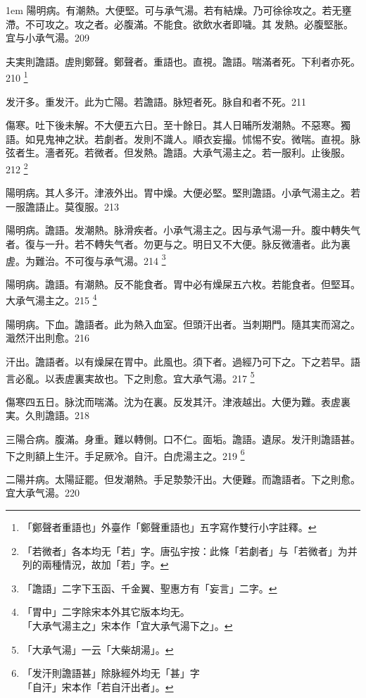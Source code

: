 \hangindent 1em
陽明病。有潮熱。大便堅。可与承气湯。若有結燥。乃可徐徐攻之。若无壅滯。不可攻之。攻之者。必腹滿。不能食。欲飲水者即噦。其{\sungtpii 𠊱}发熱。必腹堅胀。宜与小承气湯。{\gaoben}209

夫実則譫語。虗則鄭聲。鄭聲者。重語也。直視。譫語。喘滿者死。下利者亦死。210
	\footnote{「鄭聲者重語也」外臺作「鄭聲重語也」五字寫作雙行小字註釋。}

发汗多。重发汗。{\khaaitp 此为}亡陽。{\khaaitp 若}譫語。脉短者死。脉自和者不死。211

傷寒。吐下後未解。不大便五六日。至十餘日。其人日晡所发潮熱。不惡寒。獨語。如見鬼{\khaaitp 神之}狀。若劇者。发則不識人。順衣妄撮。怵惕不安。微喘。直視。脉弦者生。濇者死。{\khaaitp 若}微者。但发熱。譫語。{\khaaitp 大}承气湯主之。若一服利。止後服。212
	\footnote{
		「若微者」各本均无「若」字。唐弘宇按：此條「若劇者」与「若微者」为并列的兩種情況，故加「若」字。
	}

陽明病。其人多汗。津液外出。胃中燥。大便必堅。堅則譫語。{\khaaitp 小}承气湯主之。{\khaaitp 若一服譫語止。莫復服。}213

陽明病。譫語。发潮熱。脉滑疾者。{\khaaitp 小}承气湯主之。因与承气湯一升。腹中轉失气者。復与一升。若不轉失气者。勿更与之。明日又不大便。脉反微濇者。此为裏虗。为難治。不可復与承气湯。214
	\footnote{「譫語」二字下玉函、千金翼、聖惠方有「妄言」二字。}

陽明病。譫語。有潮熱。反不能食者。{\khaaitp 胃中}必有燥屎五六枚。若能食者。但堅耳。{\khaaitp 大}承气湯主之。215
	\footnote{「胃中」二字除宋本外其它版本均无。\\「大承气湯主之」宋本作「宜大承气湯下之」。}

陽明病。下血。譫語者。此为熱入血室。但頭汗出者。当刺期門。隨其実而瀉之。濈然汗出則愈。216

汗出。譫語者。以有燥屎在胃中。此風也。{\khaaitp 須下者。}過經乃可下之。下之若早。語言必亂。以表虗裏実故也。下之則愈。宜{\khaaitp 大}承气湯。217
	\footnote{「大承气湯」一云「大柴胡湯」。}

傷寒四五日。脉沈而喘滿。沈为在裏。反发其汗。津液越出。大便为難。表虗裏実。久則譫語。218

三陽合病。腹滿。身重。難以轉側。口不仁。面垢。譫語。遺尿。发汗則譫語{\khaaitp 甚}。下之則額上生汗。手足厥冷。自汗。白虎湯主之。219
	\footnote{「发汗則譫語甚」除脉經外均无「甚」字\\「自汗」宋本作「若自汗出者」。}

二陽并病。太陽証罷。但发潮熱。手足漐漐汗出。大便難。而譫語者。下之則愈。宜{\khaaitp 大}承气湯。220


